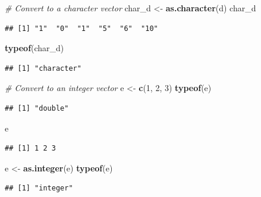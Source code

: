 \documentclass[
]{book}
\newenvironment{Shaded}{\begin{snugshade}}{\end{snugshade}}
\newcommand{\CommentTok}[1]{\textcolor[rgb]{0.56,0.35,0.01}{\textit{#1}}}
\newcommand{\DecValTok}[1]{\textcolor[rgb]{0.00,0.00,0.81}{#1}}
\newcommand{\KeywordTok}[1]{\textcolor[rgb]{0.13,0.29,0.53}{\textbf{#1}}}
\newcommand{\NormalTok}[1]{#1}
\newcommand{\StringTok}[1]{\textcolor[rgb]{0.31,0.60,0.02}{#1}}
\begin{document}
\begin{Shaded}
\begin{Highlighting}[]
\CommentTok{# Convert to a character vector}
\NormalTok{char_d <-}\StringTok{ }\KeywordTok{as.character}\NormalTok{(d)}
\NormalTok{char_d}
\end{Highlighting}
\end{Shaded}

\begin{verbatim}
## [1] "1"  "0"  "1"  "5"  "6"  "10"
\end{verbatim}

\begin{Shaded}
\begin{Highlighting}[]
\KeywordTok{typeof}\NormalTok{(char_d)}
\end{Highlighting}
\end{Shaded}

\begin{verbatim}
## [1] "character"
\end{verbatim}

\begin{Shaded}
\begin{Highlighting}[]
\CommentTok{# Convert to an integer vector}
\NormalTok{e <-}\StringTok{ }\KeywordTok{c}\NormalTok{(}\DecValTok{1}\NormalTok{, }\DecValTok{2}\NormalTok{, }\DecValTok{3}\NormalTok{)}
\KeywordTok{typeof}\NormalTok{(e)}
\end{Highlighting}
\end{Shaded}

\begin{verbatim}
## [1] "double"
\end{verbatim}

\begin{Shaded}
\begin{Highlighting}[]
\NormalTok{e}
\end{Highlighting}
\end{Shaded}

\begin{verbatim}
## [1] 1 2 3
\end{verbatim}

\begin{Shaded}
\begin{Highlighting}[]
\NormalTok{e <-}\StringTok{ }\KeywordTok{as.integer}\NormalTok{(e)}
\KeywordTok{typeof}\NormalTok{(e)}
\end{Highlighting}
\end{Shaded}

\begin{verbatim}
## [1] "integer"
\end{verbatim}
\end{document}
